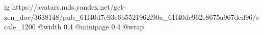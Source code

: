  
 
 
 
 

\ifcmt
  ig https://avatars.mds.yandex.net/get-zen_doc/3638148/pub_61f40d7c93c6b5521962f90a_61f40dc962e8675a967dcd96/scale_1200
  @width 0.4
  @minipage 0.4
  @wrap \parpic[r]
\fi
